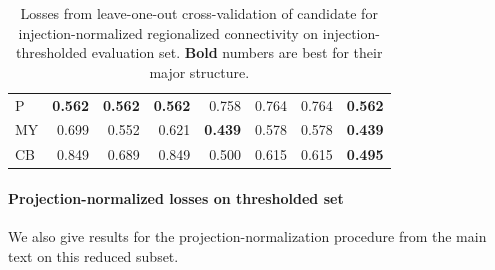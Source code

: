\begin{table}[H]
\begin{tabular}{lrrrrrrr}
P         &          \textbf{0.562 }&    \textbf{     0.562 }&      \textbf{    0.562 }&  0.758 &             0.764 &  0.764 &  \textbf{0.562} \\
MY        &          0.699 &          0.552 &          0.621 &  \textbf{0.439 }&             0.578 &  0.578 & \textbf{ 0.439} \\
CB        &          0.849 &          0.689 &          0.849 &  0.500 &             0.615 &  0.615 & \textbf{ 0.495} \\
\bottomrule
\end{tabular}
\caption{Losses from leave-one-out cross-validation of candidate for injection-normalized regionalized connectivity on injection-thresholded evaluation set. \textbf{Bold} numbers are best for their major structure.} 
\label{tab:eval_size}
\end{table}

\newpage
\paragraph{Projection-normalized losses on thresholded set}

We also give results for the projection-normalization procedure from the main text on this reduced subset.

